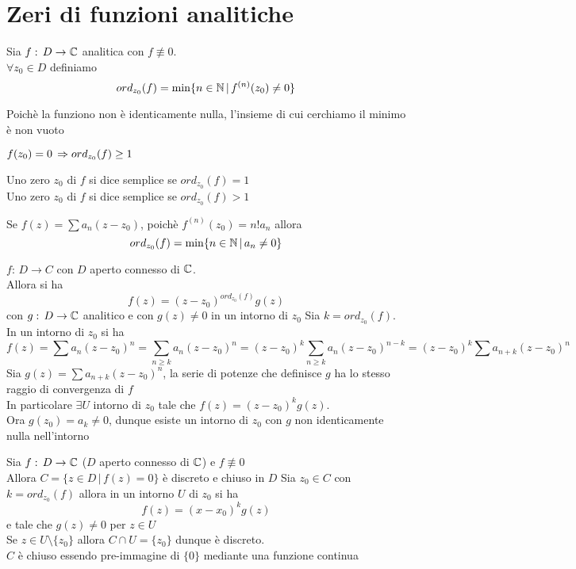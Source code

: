 \section{Zeri di funzioni analitiche}
\begin{defn}Sia $f:\, D \to \mathbb{C}$ analitica con $f\not \equiv 0 $.\\
$\forall z_0\in D $ definiamo $$ord_{z_0}(f)=\min\{ n\in \mathbb{N} \, \vert \, f^{(n)}(z_0)\neq 0\}$$
\begin{oss}Poich\`e la funziono non \`e identicamente nulla, l'insieme di cui cerchiamo il minimo \`e non vuoto
\end{oss}
\begin{oss}$f(z_0)=0 \, \Rightarrow ord_{z_0}(f)\geq 1$
\end{oss}
\begin{defn}Uno zero $z_0$ di $f$  si dice semplice se $ord_{z_0}(f) =1$\\
Uno zero $z_0$ di $f$  si dice semplice se $ord_{z_0}(f) >1$\\
\end{defn}
\end{defn}
\begin{oss}Se $f(z)=\sum a_n(z-z_0)$, poich\`e $f^{(n)}(z_0)=n!a_n$ allora $$ord_{z_0}(f)=\min\{ n \in \mathbb{N}\, \vert \, a_n \neq 0 \}$$
\end{oss}
\begin{prop} $f:\, D \to C$ con $D$ aperto connesso di $\mathbb{C}$.\\
Allora si ha
$$f(z) = (z-z_0)^{ord_{z_0}(f)}g(z)$$
con $g:\, D \to \mathbb{C}$ analitico e con $g(z)\neq 0 $ in un intorno di $z_0$
\proof Sia $k=ord_{z_0}(f)$.\\
In un intorno di $z_0$ si ha
$$f(z)= \sum a_n(z-z_0)^n =\sum_{n\geq k} a_n (z-z_0)^n =(z-z_0)^k \sum_{n \geq k} a_n (z-z_0)^{n-k}=(z-z_0)^k \sum a_{n+k} (z-z_0)^n$$
Sia $g(z)=\sum a_{n+k} (z-z_0)^n$, la serie di potenze che definisce $g$ ha lo stesso raggio di convergenza di $f$\\
In  particolare $\exists U$ intorno di $z_0$ tale che $f(z) = (z-z_0)^k g(z)$.\\
Ora $g(z_0)=a_k\neq 0$, dunque esiste un intorno di $z_0$ con $g$ non identicamente nulla nell'intorno
\end{prop}
\begin{cor}Sia $f:\, D \to \mathbb{C}$ ($D$ aperto connesso di $\mathbb{C}$) e $f\not\equiv 0$\\
Allora $C=\{ z \in D \, \vert \, f(z)=0\}$ \`e discreto e chiuso in $D$
\proof Sia $z_0\in C$ con $k=ord_{z_0}(f)$ allora in un intorno $U$ di $z_0$ si ha $$f(z)=(x-x_0)^k g(z)$$ e tale che $g(z)\neq 0 $ per $z\in U$\\
Se $z\in U \setminus\{ z_0\}$ allora $C\cap U =\{ z_0\}$ dunque \`e discreto.\\
$C$ \`e chiuso essendo pre-immagine di $\{0\}$ mediante una funzione continua
\end{cor}
\newpage
